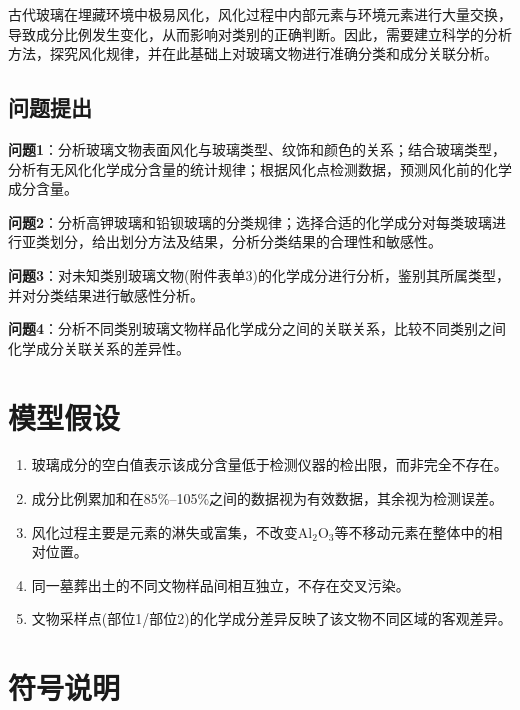 \documentclass[12pt,a4paper]{ctexart}
\begin{document}
古代玻璃在埋藏环境中极易风化，风化过程中内部元素与环境元素进行大量交换，导致成分比例发生变化，从而影响对类别的正确判断。因此，需要建立科学的分析方法，探究风化规律，并在此基础上对玻璃文物进行准确分类和成分关联分析。

\subsection{问题提出}

\textbf{问题1}：分析玻璃文物表面风化与玻璃类型、纹饰和颜色的关系；结合玻璃类型，分析有无风化化学成分含量的统计规律；根据风化点检测数据，预测风化前的化学成分含量。

\textbf{问题2}：分析高钾玻璃和铅钡玻璃的分类规律；选择合适的化学成分对每类玻璃进行亚类划分，给出划分方法及结果，分析分类结果的合理性和敏感性。

\textbf{问题3}：对未知类别玻璃文物(附件表单3)的化学成分进行分析，鉴别其所属类型，并对分类结果进行敏感性分析。

\textbf{问题4}：分析不同类别玻璃文物样品化学成分之间的关联关系，比较不同类别之间化学成分关联关系的差异性。

\section{模型假设}

\begin{enumerate}
    \item 玻璃成分的空白值表示该成分含量低于检测仪器的检出限，而非完全不存在。
    \item 成分比例累加和在85\%--105\%之间的数据视为有效数据，其余视为检测误差。
    \item 风化过程主要是元素的淋失或富集，不改变Al$_2$O$_3$等不移动元素在整体中的相对位置。
    \item 同一墓葬出土的不同文物样品间相互独立，不存在交叉污染。
    \item 文物采样点(部位1/部位2)的化学成分差异反映了该文物不同区域的客观差异。
\end{enumerate}

\section{符号说明}
\end{document}
